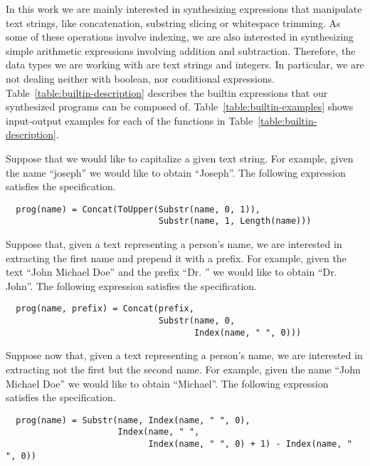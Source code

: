 In this work we are mainly interested in synthesizing expressions that
manipulate text strings, like concatenation, substring slicing or whitespace
trimming. As some of these operations involve indexing, we are also interested
in synthesizing simple arithmetic expressions involving addition and
subtraction. Therefore, the data types we are working with are text strings and
integers. In particular, we are not dealing neither with boolean, nor conditional
expressions. Table~\ref{table:builtin-description} describes the builtin
expressions that our synthesized programs can be composed of.
Table~\ref{table:builtin-examples} shows input-output examples for each of the
functions in Table~\ref{table:builtin-description}.

\begin{example}
  Suppose that we would like to capitalize a given text string. For example,
given the name ``joseph'' we would like to obtain ``Joseph''. The following
expression satisfies the specification.

\begin{lstlisting}
  prog(name) = Concat(ToUpper(Substr(name, 0, 1)),
                              Substr(name, 1, Length(name)))
\end{lstlisting}
\end{example}

\begin{example}\label{ex:first-name}
  Suppose that, given a text representing a person's name, we are interested in
extracting the first name and prepend it with a prefix. For example, given the
text ``John Michael Doe'' and the prefix ``Dr. '' we would like to obtain
``Dr. John''. The following expression satisfies the specification.
 
\begin{lstlisting}
  prog(name, prefix) = Concat(prefix,
                              Substr(name, 0,
                                     Index(name, " ", 0)))
\end{lstlisting}
\end{example}

\begin{example}\label{ex:second-name}
  Suppose now that, given a text representing a person's name, we are interested
in extracting not the first but the second name. For example, given the name
``John Michael Doe'' we would like to obtain ``Michael''. The following
expression satisfies the specification.
 
\begin{lstlisting}
  prog(name) = Substr(name, Index(name, " ", 0),
                      Index(name, " ",
                            Index(name, " ", 0) + 1) - Index(name, " ", 0))
\end{lstlisting}
\end{example}

